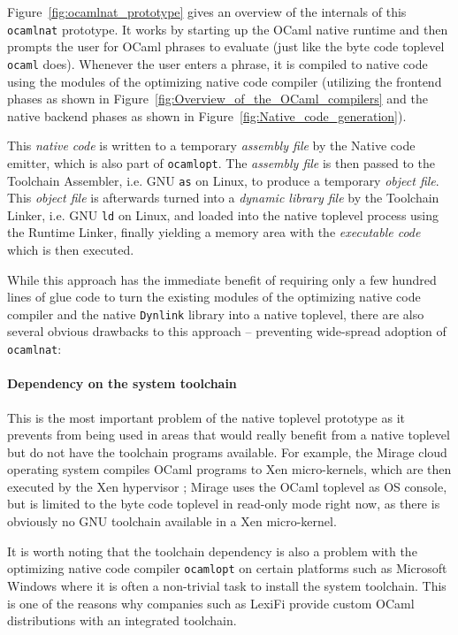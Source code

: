 \documentclass[10pt,a4paper,final,twocolumn]{article}
\makeatletter
\newcommand{\ie}{i.e.\@\xspace}
\makeatother
\begin{document}
Figure~\ref{fig:ocamlnat_prototype} gives an overview of the internals of this \texttt{ocamlnat} prototype.
It works by starting up the OCaml native runtime and then prompts the user for OCaml phrases to evaluate
(just like the byte code toplevel \texttt{ocaml} does). Whenever the user enters a phrase, it is compiled
to native code using the modules of the optimizing native code compiler (utilizing the frontend phases as
shown in Figure~\ref{fig:Overview_of_the_OCaml_compilers} and the native backend phases as shown in
Figure~\ref{fig:Native_code_generation}).

This \emph{native code} is written to a temporary \emph{assembly file} by the Native code emitter, which
is also part of \texttt{ocamlopt}. The \emph{assembly file} is then passed to the Toolchain Assembler, \ie GNU
\texttt{as} on Linux, to produce a temporary \emph{object file}. This \emph{object file} is afterwards turned
into a \emph{dynamic library file} by the Toolchain Linker, \ie GNU \texttt{ld} on Linux, and loaded into the
native toplevel process using the Runtime Linker, finally yielding a memory area with the \emph{executable code}
which is then executed.

While this approach has the immediate benefit of requiring only a few hundred lines of glue code to turn
the existing modules of the optimizing native code compiler and the native \texttt{Dynlink} library into
a native toplevel, there are also several obvious drawbacks to this approach -- preventing wide-spread
adoption of \texttt{ocamlnat}:

\paragraph{Dependency on the system toolchain}

This is the most important problem of the native toplevel prototype as it prevents from being
used in areas that would really benefit from a native toplevel but do not have the toolchain programs
available. For example, the Mirage cloud operating system \cite{Mirage11,Madhavapeddy10,Madhavapeddy10hotcloud}
compiles OCaml programs to Xen micro-kernels, which are then executed by the Xen hypervisor \cite{Xen11}; Mirage uses
the OCaml toplevel as OS console, but is limited to the byte code toplevel in read-only mode right now, as
there is obviously no GNU toolchain available in a Xen micro-kernel.

It is worth noting that the toolchain dependency is also a problem with the optimizing native code compiler
\texttt{ocamlopt} on certain platforms such as Microsoft Windows where it is often a non-trivial task to
install the system toolchain. This is one of the reasons why companies such as LexiFi provide custom OCaml
distributions with an integrated toolchain.
\end{document}
